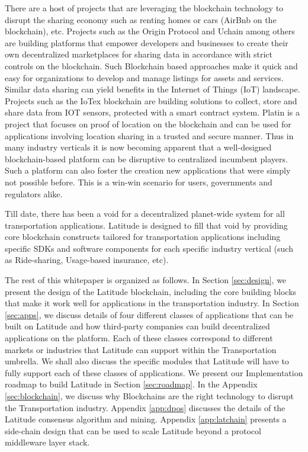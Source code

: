There are a host of projects that are leveraging the blockchain technology to disrupt the sharing economy such as
renting homes or cars (AirBnb on the blockchain), etc. Projects such as the Origin Protocol and Uchain among others are
building platforms that empower developers and businesses to create their own decentralized marketplaces for sharing
data in accordance with strict controls on the blockchain.  Such Blockchain based approaches make it quick and easy for
organizations to develop and manage listings for assets and services. Similar data sharing can yield benefits in the
Internet of Things (IoT) landscape. Projects such as the IoTex blockchain are building solutions to collect, store and
share data from IOT sensors, protected with a smart contract system.  Platin \cite{platin} is a project that focuses on
proof of location on the blockchain and can be used for applications involving location sharing in a trusted and secure
manner. Thus in many industry verticals it is now becoming apparent that a well-designed blockchain-based platform can
be disruptive to centralized incumbent players. Such a platform can also foster the creation new applications that were
simply not possible before. This is a win-win scenario for users, governments and regulators alike.

Till date, there has been a void for a decentralized planet-wide system for all transportation applications. Latitude is
designed to fill that void by providing core blockchain constructs tailored for transportation applications including
specific SDKs and software components for each specific industry vertical (such as Ride-sharing, Usage-based insurance,
etc).

The rest of this whitepaper is organized as follows.  In Section \ref{sec:design}, we present the design of the Latitude
blockchain, including the core building blocks that make it work well for applications in the transportation industry.
In Section \ref{sec:apps}, we discuss details of four different classes of applications that can be built on Latitude
and how third-party companies can build decentralized applications on the platform. Each of these classes correspond to
different markets or industries that Latitude can support within the Transportation umbrella. We shall also discuss the
specific modules that Latitude will have to fully support each of these classes of applications. We present our
Implementation roadmap to build Latitude in Section \ref{sec:roadmap}. In the Appendix \ref{sec:blockchain}, we discuss
why Blockchains are the right technology to disrupt the Transportation industry. Appendix \ref{app:dpos} discusses the
details of the Latitude consensus algorithm and mining. Appendix \ref{app:latchain} presents a side-chain design that
can be used to scale Latitude beyond a protocol middleware layer stack.

